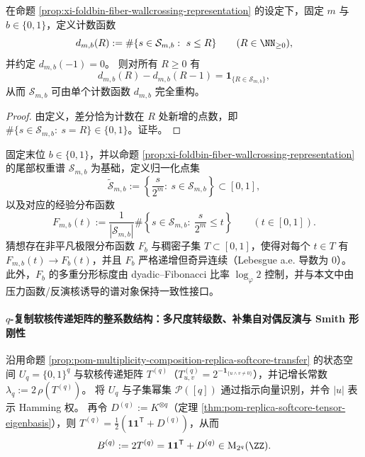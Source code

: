 \begin{corollary}[离散差分恢复尾部权重谱]\label{cor:xi-foldbin-tail-spectrum-discrete-difference}
在命题 \ref{prop:xi-foldbin-fiber-wallcrossing-representation} 的设定下，固定 \(m\) 与 \(b\in\{0,1\}\)，定义计数函数
\[
d_{m,b}(R):=\#\{s\in\mathcal{S}_{m,b}:\ s\le R\}\qquad(R\in\NN_{\ge 0}),
\]
并约定 \(d_{m,b}(-1)=0\)。
则对所有 \(R\ge 0\) 有
\[
d_{m,b}(R)-d_{m,b}(R-1)=\mathbf{1}_{\{R\in\mathcal{S}_{m,b}\}},
\]
从而 \(\mathcal{S}_{m,b}\) 可由单个计数函数 \(d_{m,b}\) 完全重构。
\end{corollary}
\begin{proof}
由定义，差分恰为计数在 \(R\) 处新增的点数，即 \(\#\{s\in\mathcal{S}_{m,b}:\ s=R\}\in\{0,1\}\)。证毕。
\end{proof}



\begin{conjecture}\label{conj:xi-foldbin-tail-spectrum-singular-limit}
固定末位 \(b\in\{0,1\}\)，并以命题 \ref{prop:xi-foldbin-fiber-wallcrossing-representation} 的尾部权重谱 \(\mathcal{S}_{m,b}\) 为基础，定义归一化点集
\[
\widetilde{\mathcal{S}}_{m,b}:=\left\{\frac{s}{2^m}:\ s\in\mathcal{S}_{m,b}\right\}\subset[0,1],
\]
以及对应的经验分布函数
\[
F_{m,b}(t):=\frac{1}{|\mathcal{S}_{m,b}|}\#\left\{s\in\mathcal{S}_{m,b}:\ \frac{s}{2^m}\le t\right\}\qquad(t\in[0,1]).
\]
猜想存在非平凡极限分布函数 \(F_b\) 与稠密子集 \(T\subset[0,1]\)，使得对每个 \(t\in T\) 有 \(F_{m,b}(t)\to F_b(t)\)，并且 \(F_b\) 严格递增但奇异连续（Lebesgue a.e. 导数为 \(0\)）。
此外，\(F_b\) 的多重分形标度由 dyadic--Fibonacci 比率 \(\log_\varphi 2\) 控制，并与本文中由压力函数/反演核诱导的谱对象保持一致性接口。
\end{conjecture}

\paragraph{\texorpdfstring{$q$}{q}-复制软核传递矩阵的整系数结构：多尺度转级数、补集自对偶反演与 Smith 形刚性}
沿用命题 \ref{prop:pom-multiplicity-composition-replica-softcore-transfer} 的状态空间 \(U_q=\{0,1\}^q\) 与软核传递矩阵 \(T^{(q)}\)（\(T^{(q)}_{u,v}=2^{-\mathbf{1}_{\{u\wedge v\neq 0\}}}\)），并记增长常数
\(
\lambda_q:=2\,\rho(T^{(q)})
\)。
将 \(U_q\) 与子集幂集 \(\mathcal P([q])\) 通过指示向量识别，并令 \(|u|\) 表示 Hamming 权。
再令 \(D^{(q)}:=K^{\otimes q}\)（定理 \ref{thm:pom-replica-softcore-tensor-eigenbasis}），则
\(
T^{(q)}=\frac12(\mathbf{1}\mathbf{1}^{\mathsf T}+D^{(q)})
\)，从而
\[
B^{(q)}:=2T^{(q)}=\mathbf{1}\mathbf{1}^{\mathsf T}+D^{(q)}\in \mathrm{M}_{2^q}(\ZZ).
\]

